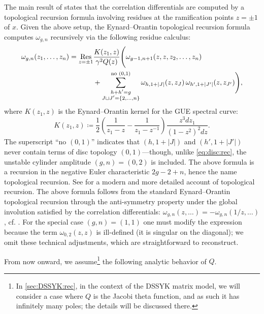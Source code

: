 \documentclass[a4paper,11pt,english]{article}
\theoremstyle{plain}
\theoremstyle{definition}
\theoremstyle{plain}
\DeclareMathOperator*{\Res}{Res}
\begin{document}
The main result of \cite{Eyn04,CEO06,EO07} states that the correlation differentials  are computed by a topological recursion formula involving residues at the ramification points $z = \pm 1$ of $x$. Given the above setup, the Eynard--Orantin topological recursion formula computes $\omega_{g,n}$ recursively via the following residue calculus:
\begin{equation}\label{eq:EO}
\begin{split}
	\omega_{g,n}(z_1,\dots,z_n)
	=
    \Res_{z = \pm 1} & \frac{K(z_1,z)}{\gamma^2 Q(z)}
	\Bigg(
		\omega_{g-1,n+1}(z,z,z_2,\dots,z_n) \\
		& +
		\sum_{\substack{h + h' = g \\ J \sqcup J' = \{2,\dots,n\}}}^{\textup{no }(0,1)}
			\omega_{h,1+|J|}(z,z_J) \,
			\omega_{h',1+|J'|}(z,z_{J'})
	\Bigg),
\end{split}
\end{equation}
where $K(z_1,z)$ is the Eynard--Orantin kernel for the GUE spectral curve:
\begin{equation}\label{eq:kernel}
	K(z_1,z)
	\coloneqq
	\frac{1}{2} \left(
		\frac{1}{z_1 - z} - \frac{1}{z_1 - z^{-1}}
	\right)
	\frac{z^3 dz_1}{(1 - z^2)^2 dz}.
\end{equation}
The superscript ``no $(0,1)$'' indicates that $(h,1+|J|)$ and $(h',1+|J'|)$ never contain terms of disc topology $(0,1)$---though, unlike \cref{eq:disc:rec}, the unstable cylinder amplitude $(g,n) = (0,2)$ is included. The above formula is a recursion in the negative Euler characteristic $2g - 2 + n$, hence the name topological recursion. See \cite{Bou26} for a modern and more detailed account of topological recursion. The above formula follows from the standard Eynard--Orantin topological recursion through the anti-symmetry property under the global involution satisfied by the correlation differentials: $\omega_{g,n}(z,\ldots) = -\omega_{g,n}(1/z,\ldots)$, cf. \cite[equation~(4.2.17)]{EKR15}. For the special case $(g,n) = (1,1)$ one must modify the expression because the term $\omega_{0,2}(z,z)$ is ill-defined (it is singular on the diagonal); we omit these technical adjustments, which are straightforward to reconstruct.

From now onward, we assume\footnote{
    In \cref{sec:DSSYK:rec}, in the context of the DSSYK matrix model, we will consider a case where $Q$ is the Jacobi theta function, and as such it has infinitely many poles; the details will be discussed there.
} the following analytic behavior of $Q$.
\end{document}
